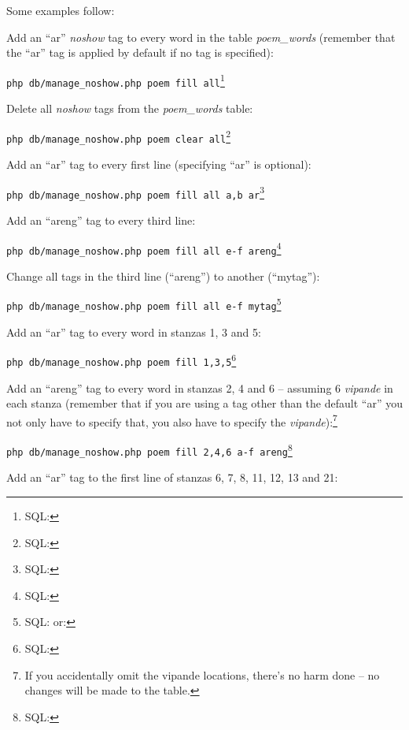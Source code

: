Some examples follow:

Add an ``ar'' \textit{noshow} tag to every word in the table \textit{poem_words} (remember that the ``ar'' tag is applied by default if no tag is specified):

\indent\verb|php db/manage_noshow.php poem fill all|\footnote{SQL: }

Delete all \textit{noshow} tags from the \textit{poem_words} table:

\indent\verb|php db/manage_noshow.php poem clear all|\footnote{SQL: }

Add an ``ar'' tag to every first line (specifying ``ar'' is optional):

\indent\verb|php db/manage_noshow.php poem fill all a,b ar|\footnote{SQL: }

Add an ``areng'' tag to every third line:

\indent\verb|php db/manage_noshow.php poem fill all e-f areng|\footnote{SQL: }

Change all tags in the third line (``areng'') to another (``mytag''):

\indent\verb|php db/manage_noshow.php poem fill all e-f mytag|\footnote{SQL:  or: }

Add an ``ar'' tag to every word in stanzas 1, 3 and 5:

\indent\verb|php db/manage_noshow.php poem fill 1,3,5|\footnote{SQL: }

Add an ``areng'' tag to every word in stanzas 2, 4 and 6 -- assuming 6 \textit{vipande} in each stanza (remember that if you are using a tag other than the default ``ar'' you not only have to specify that, you also have to specify the \textit{vipande}):\footnote{If you accidentally omit the vipande locations, there's no harm done -- no changes will be made to the table.}

\indent\verb|php db/manage_noshow.php poem fill 2,4,6 a-f areng|\footnote{SQL: }

Add an ``ar'' tag to the first line of stanzas 6, 7, 8, 11, 12, 13 and 21:


